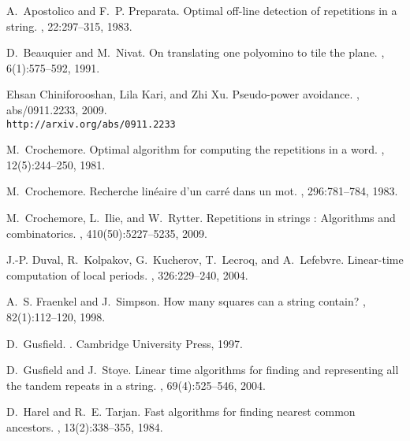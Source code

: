 \documentclass{article}
\def\eat#1{}
\begin{document}
\begin{thebibliography}{10}

A.~Apostolico and F.~P. Preparata.
\newblock Optimal off-line detection of repetitions in a string.
, 22:297--315, 1983.

D.~Beauquier and M.~Nivat.
\newblock On translating one polyomino to tile the plane.
, 6(1):575--592, 1991.

Ehsan Chiniforooshan, Lila Kari, and Zhi Xu.
\newblock Pseudo-power avoidance.
, abs/0911.2233, 2009.
\newblock \\{\tt http://arxiv.org/abs/0911.2233}\eat.

M.~Crochemore.
\newblock Optimal algorithm for computing the repetitions in a word.
, 12(5):244--250, 1981.

M.~Crochemore.
\newblock Recherche lin\'eaire d'un carr\'e dans un mot.
, 296:781--784, 1983.

M.~Crochemore, L.~Ilie, and W.~Rytter.
\newblock Repetitions in strings : Algorithms and combinatorics.
, 410(50):5227--5235, 2009.

{J.-P.} Duval, R.~Kolpakov, G.~Kucherov, T.~Lecroq, and A.~Lefebvre.
\newblock Linear-time computation of local periods.
, 326:229--240, 2004.

A.~S. Fraenkel and J.~Simpson.
\newblock How many squares can a string contain?
, 82(1):112--120, 1998.

D.~Gusfield.
.
\newblock Cambridge University Press, 1997.

D.~Gusfield and J.~Stoye.
\newblock Linear time algorithms for finding and representing all the tandem
  repeats in a string.
, 69(4):525--546, 2004.

D.~Harel and R.~E. Tarjan.
\newblock Fast algorithms for finding nearest common ancestors.
, 13(2):338--355, 1984.


\end{thebibliography}
\end{document}

